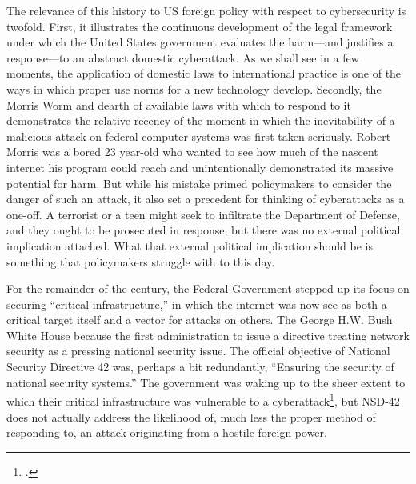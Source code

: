 \documentclass{report}
\begin{document}
\begin{refsegment}
The relevance of this history to US foreign policy with respect to cybersecurity is twofold. First, it illustrates the continuous development of the legal framework under which the United States government evaluates the harm---and justifies a response---to an abstract domestic cyberattack. As we shall see in a few moments, the application of domestic laws to international practice is one of the ways in which proper use norms for a new technology develop. Secondly, the Morris Worm and dearth of available laws with which to respond to it demonstrates the relative recency of the moment in which the inevitability of a malicious attack on federal computer systems was first taken seriously. Robert Morris was a bored 23 year-old who wanted to see how much of the nascent internet his program could reach and unintentionally demonstrated its massive potential for harm. But while his mistake primed policymakers to consider the danger of such an attack, it also set a precedent for thinking of cyberattacks as a one-off. A terrorist or a teen might seek to infiltrate the Department of Defense, and they ought to be prosecuted in response, but there was no external political implication attached. What that external political implication should be is something that policymakers struggle with to this day.

For the remainder of the  century, the Federal Government stepped up its focus on securing ``critical infrastructure,'' in which the internet was now see as both a critical target itself and a vector for attacks on others. The George H.W. Bush White House because the first administration to issue a directive treating network security as a pressing national security issue. The official objective of National Security Directive 42 was, perhaps a bit redundantly, ``Ensuring the security of national security systems.'' The government was waking up to the sheer extent to which their critical infrastructure was vulnerable to a cyberattack\footcite{bush_national_1990}, but NSD-42 does not actually address the likelihood of, much less the proper method of responding to, an attack originating from a hostile foreign power.


\end{refsegment}
\end{document}
